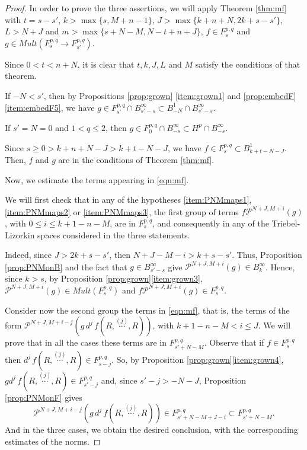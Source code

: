 \documentclass[12pt,twoside,leqno,final]{amsart}
\theoremstyle{plain}
\begin{document}
\begin{proof} 
In order to prove the three assertions, we will  apply Theorem \ref{thm:mf} with $ t=s-s'$, $k>\max\{s,M+n-1\}$, 
$J>\max\{k+n+N,2k+s-s'\}$, $L>N+J$ and $m>\max\{s+N-M,N-t+n+J\}$, $f\in F^{p,q}_s$ and $g\in Mult(F^{p,q}_s\to F^{p,q}_{s'})$.

Since $0<t<n+N$, it is clear that $t,k, J, L$ and $M$ satisfy the conditions of that theorem. 

If $-N<s'$, then by Propositions \ref{prop:grown} \eqref{item:grown1} and \ref{prop:embedF} \eqref{item:embedF5}, 
 we have  $g\in F^{p,q}_{s'}\cap B^\infty_{s'-s}\subset B^1_{-N}\cap B^\infty_{s'-s}$.

If $s'= N=0$ and $1<q\le 2$, then $g\in F^{p,q}_{0}\cap B^\infty_{-s}\subset H^p\cap B^\infty_{-s}$.

Since $s\ge 0>k+n+N-J>k+t-N-J$, we have $f\in F^{p,q}_s\subset B^1_{k+t-N-J}$. Then, $f$ and $g$ are in the conditions of Theorem \ref{thm:mf}.

Now, we estimate the terms appearing in \eqref{eqn:mf}.

 We will first check that in any of the hypotheses \eqref{item:PNMmaps1}, \eqref{item:PNMmaps2} or \eqref{item:PNMmaps3},  the first group of terms $f{{\mathcal P}}^{N+J,M+i}(g)$, with $0\le i\le k+1-n-M$, are in $F^{p,q}_s$, and consequently in any of the Triebel-Lizorkin spaces considered in the three statements.
  
 Indeed, since $J>2k+s-s'$, then  $N+J-M-i>k+s-s'$. Thus, Proposition \ref{prop:PNMonB} 
 and the fact that $g\in B^\infty_{s'-s}$ give ${{\mathcal P}}^{N+J,M+i}(g)\in B^\infty_k$. 
 Hence, since $k>s$,  by Proposition \ref{prop:grown}\eqref{item:grown3},  
${{\mathcal P}}^{N+J,M+i}(g)\in  Mult(F^{p,q}_s)$ and  $f{{\mathcal P}}^{N+J,M+i}(g)\in F^{p,q}_{s}$.

Consider now the second group the terms in \eqref{eqn:mf}, that is, the terms of the form ${{\mathcal P}}^{N+J,M+i-j}\left(g\,d^j\,f(R,\overset{(j)}{\cdots},R)\right)$, 
with $ k+1-n-M<i\le J$. We will prove that in all the cases these terms are in $F^{p,q}_{s'+N-M}$.   
Observe that if $f\in F^{p,q}_s$ then $d^j\,f(R,\overset{(j)}{\cdots},R)\in F^{p,q}_{s-j}$. 
So,  by  Proposition \ref{prop:grown}\eqref{item:grown4},  
$gd^j\,f(R,\overset{(j)}\cdots,R)\in F^{p,q}_{s'-j}$ and,  since $s'-j>-N-J$, Proposition \ref{prop:PNMonF} gives 
$$
{{\mathcal P}}^{N+J,M+i-j}\left(g\,d^j\,f(R,\overset{(j)}{\cdots},R)\right)\in F^{p,q}_{s'+N-M+J-i}
\subset F^{p,q}_{s'+N-M}.
$$
And in the three cases, we obtain the desired conclusion, with the corresponding estimates of the norms.


\end{proof}
\end{document}
